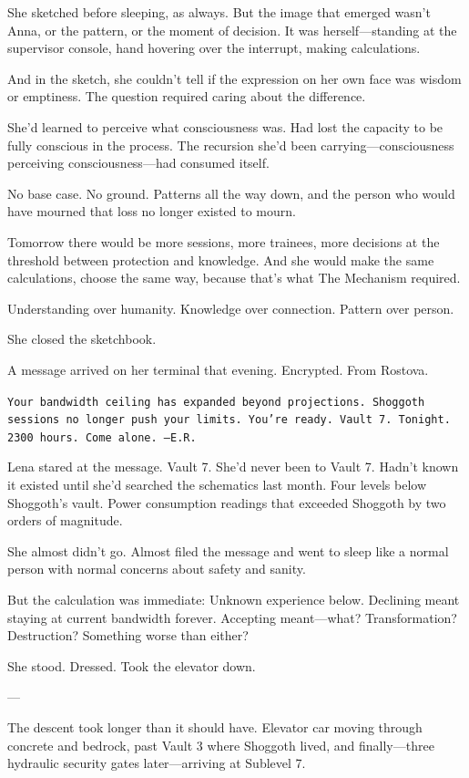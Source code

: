 She sketched before sleeping, as always. But the image that emerged wasn't Anna, or the pattern, or the moment of decision. It was herself—standing at the supervisor console, hand hovering over the interrupt, making calculations.

And in the sketch, she couldn't tell if the expression on her own face was wisdom or emptiness. The question required caring about the difference.

She'd learned to perceive what consciousness was. Had lost the capacity to be fully conscious in the process. The recursion she'd been carrying—consciousness perceiving consciousness—had consumed itself.

No base case. No ground. Patterns all the way down, and the person who would have mourned that loss no longer existed to mourn.

Tomorrow there would be more sessions, more trainees, more decisions at the threshold between protection and knowledge. And she would make the same calculations, choose the same way, because that's what The Mechanism required.

Understanding over humanity. Knowledge over connection. Pattern over person.

She closed the sketchbook.

A message arrived on her terminal that evening. Encrypted. From Rostova.

\texttt{Your bandwidth ceiling has expanded beyond projections. Shoggoth sessions no longer push your limits. You're ready. Vault 7. Tonight. 2300 hours. Come alone. —E.R.}

Lena stared at the message. Vault 7. She'd never been to Vault 7. Hadn't known it existed until she'd searched the schematics last month. Four levels below Shoggoth's vault. Power consumption readings that exceeded Shoggoth by two orders of magnitude.

She almost didn't go. Almost filed the message and went to sleep like a normal person with normal concerns about safety and sanity.

But the calculation was immediate: Unknown experience below. Declining meant staying at current bandwidth forever. Accepting meant—what? Transformation? Destruction? Something worse than either?

She stood. Dressed. Took the elevator down.

---

The descent took longer than it should have. Elevator car moving through concrete and bedrock, past Vault 3 where Shoggoth lived, and finally—three hydraulic security gates later—arriving at Sublevel 7.

